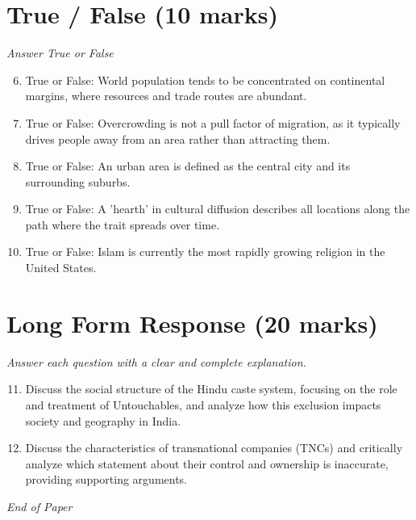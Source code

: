 \documentclass[12pt]{article}
\begin{document}
\section*{True / False (10 marks)}
\textit{Answer True or False}
\begin{enumerate}[label=\arabic*.]
\setcounter{enumi}{5}
\item True or False: World population tends to be concentrated on continental margins, where resources and trade routes are abundant.
\item True or False: Overcrowding is not a pull factor of migration, as it typically drives people away from an area rather than attracting them.
\item True or False: An urban area is defined as the central city and its surrounding suburbs.
\item True or False: A 'hearth' in cultural diffusion describes all locations along the path where the trait spreads over time.
\item True or False: Islam is currently the most rapidly growing religion in the United States.
\end{enumerate}

\section*{Long Form Response (20 marks)}
\textit{Answer each question with a clear and complete explanation.}
\begin{enumerate}[label=\arabic*.]
\setcounter{enumi}{10}
\item Discuss the social structure of the Hindu caste system, focusing on the role and treatment of Untouchables, and analyze how this exclusion impacts society and geography in India.
\item Discuss the characteristics of transnational companies (TNCs) and critically analyze which statement about their control and ownership is inaccurate, providing supporting arguments.
\end{enumerate}

\vfill
\noindent\textit{End of Paper}
\end{document}
